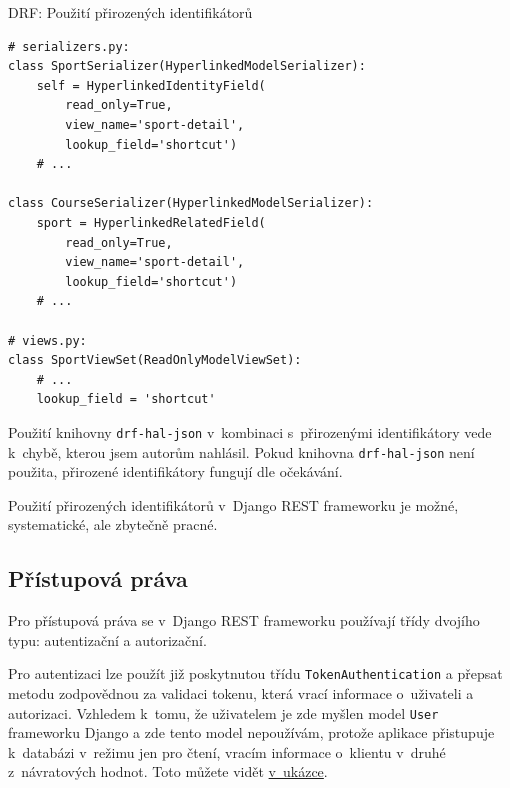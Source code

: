 \begin{listing}[htbp]
\caption{{\label{code:drf:ids}DRF: Použití přirozených identifikátorů}}
\begin{verbatim}
# serializers.py:
class SportSerializer(HyperlinkedModelSerializer):
    self = HyperlinkedIdentityField(
        read_only=True,
        view_name='sport-detail',
        lookup_field='shortcut')
    # ...

class CourseSerializer(HyperlinkedModelSerializer):
    sport = HyperlinkedRelatedField(
        read_only=True,
        view_name='sport-detail',
        lookup_field='shortcut')
    # ...

# views.py:
class SportViewSet(ReadOnlyModelViewSet):
    # ...
    lookup_field = 'shortcut'
\end{verbatim}
\end{listing}

Použití knihovny \verb!drf-hal-json! v~kombinaci s~přirozenými identifikátory vede k~chybě, kterou jsem autorům nahlásil. Pokud knihovna \verb!drf-hal-json! není použita, přirozené identifikátory fungují dle očekávání.

Použití přirozených identifikátorů v~Django REST frameworku je možné, systematické, ale zbytečně pracné.

\subsection{Přístupová práva}\label{pux159uxedstupovuxe1-pruxe1va}

Pro přístupová práva se v~Django REST frameworku používají třídy dvojího typu: autentizační a autorizační.

Pro autentizaci lze použít již poskytnutou třídu \verb!TokenAuthentication! a přepsat metodu zodpovědnou za validaci tokenu, která vrací informace o~uživateli a autorizaci. Vzhledem k~tomu, že uživatelem je zde myšlen model \verb!User! frameworku Django a zde tento model nepoužívám, protože aplikace přistupuje k~databázi v~režimu jen pro čtení, vracím informace o~klientu v~druhé z~návratových hodnot. Toto můžete vidět \protect\hyperlink{code:drf:auth}{v~ukázce}.


